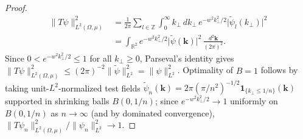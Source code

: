 \documentclass[aps,pra,reprint,nofootinbib,floatfix,longbibliography]{revtex4-2}
\theoremstyle{remark}
\newcommand{\norm}[1]{\lVert #1 \rVert}
\newcommand{\abs}[1]{\lvert #1 \rvert}
\begin{document}
\begin{proof}
\begin{align*}
\norm{T\psi}_{L^2(\Omega,\mu)}^2 &= \frac{1}{2\pi}\sum_{l\in\mathbb{Z}} \int_0^\infty k_\perp\,dk_\perp\,e^{-w^2 k_\perp^2/2}\abs{\widetilde{\psi}_l(k_\perp)}^2 \\
&= \int_{\mathbb{R}^2} e^{-w^2 k_\perp^2/2}\abs{\widetilde{\psi}(\mathbf{k})}^2\,\frac{d^2\mathbf{k}}{(2\pi)^2}.
\end{align*}
Since $0 < e^{-w^2 k_\perp^2/2} \le 1$ for all $k_\perp \ge 0$, Parseval's identity gives $\norm{T\psi}_{L^2(\Omega,\mu)}^2 \le (2\pi)^{-2}\norm{\widetilde{\psi}}_{L^2}^2 = \norm{\psi}_{L^2}^2$. Optimality of $B = 1$ follows by taking unit-$L^2$-normalized test fields $\widetilde{\psi}_n(\mathbf{k}) = 2\pi(\pi/n^2)^{-1/2}\mathbf{1}_{\{k_\perp \le 1/n\}}(\mathbf{k})$ supported in shrinking balls $B(0,1/n)$; since $e^{-w^2 k_\perp^2/2} \to 1$ uniformly on $B(0,1/n)$ as $n \to \infty$ (and by dominated convergence), $\norm{T\psi_n}_{L^2(\Omega,\mu)}^2/\norm{\psi_n}_{L^2}^2 \to 1$.
\end{proof}
\end{document}
